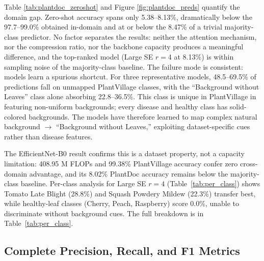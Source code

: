 \documentclass[preprint,12pt]{elsarticle}
\begin{document}
Table \ref{tab:plantdoc_zeroshot} and Figure \ref{fig:plantdoc_preds} quantify the domain gap. Zero-shot accuracy spans only 5.38--8.13\%, dramatically below the 97.7--99.0\% obtained in-domain and at or below the 8.47\% of a trivial majority-class predictor. No factor separates the results: neither the attention mechanism, nor the compression ratio, nor the backbone capacity produces a meaningful difference, and the top-ranked model (Large SE $r=4$ at 8.13\%) is within sampling noise of the majority-class baseline. The failure mode is consistent: models learn a spurious shortcut. For three representative models, 48.5--69.5\% of predictions fall on unmapped PlantVillage classes, with the ``Background without Leaves'' class alone absorbing 22.8--36.5\%. This class is unique in PlantVillage in featuring non-uniform backgrounds; every disease and healthy class has solid-colored backgrounds. The models have therefore learned to map complex natural background $\rightarrow$ ``Background without Leaves,'' exploiting dataset-specific cues rather than disease features.

The EfficientNet-B0 result confirms this is a dataset property, not a capacity limitation: 408.95 M FLOPs and 99.38\% PlantVillage accuracy confer zero cross-domain advantage, and its 8.02\% PlantDoc accuracy remains below the majority-class baseline. Per-class analysis for Large SE $r=4$ (Table~\ref{tab:per_class}) shows Tomato Late Blight (28.8\%) and Squash Powdery Mildew (22.3\%) transfer best, while healthy-leaf classes (Cherry, Peach, Raspberry) score 0.0\%, unable to discriminate without background cues. The full breakdown is in Table~\ref{tab:per_class}.

\subsection{Complete Precision, Recall, and F1 Metrics}
\label{sec:prf_metrics}
\end{document}
